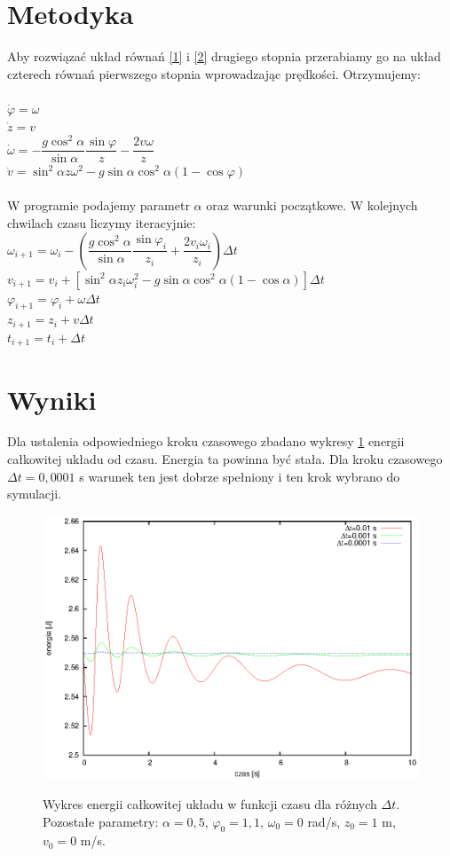 \documentclass[11pt]{article}
\begin{document}
\section*{Metodyka}
Aby rozwiązać układ równań \ref{1} i \ref{2} drugiego stopnia przerabiamy go na układ czterech równań
pierwszego stopnia wprowadzając prędkości. Otrzymujemy:\\
\\
$
\dot{\varphi}=\omega
$\\
$
\dot{z}=v
$\\
$
\dot{\omega}=-\dfrac{g\cos^2\alpha}{\sin\alpha}\dfrac{\sin\varphi}{z} - \dfrac{2v\omega}{z}
$\\
$
\dot{v}=\sin^2\alpha z \omega^2 -g\sin\alpha \cos^2\alpha(1-\cos\varphi)
$\\
$ $\\
W programie podajemy parametr $\alpha$ oraz warunki początkowe. W kolejnych chwilach czasu
liczymy iteracyjnie:\\
$ \omega_{i+1}=\omega_i-\left( \dfrac{g\cos^2\alpha}{\sin\alpha} \dfrac{\sin\varphi_i}{z_i}
+\dfrac{2v_i\omega_i}{z_i}\right)\Delta t$\\
$ v_{i+1} = v_i + \left[ \sin^2\alpha z_i \omega_i^2 -g\sin\alpha\cos^2\alpha (1-\cos\alpha )\right]\Delta t$\\
$ \varphi_{i+1} = \varphi_i +\omega \Delta t$\\
$ z_{i+1} = z_i + v\Delta t$\\
$ t_{i+1} = t_i + \Delta t $
\section*{Wyniki}
Dla ustalenia odpowiedniego kroku czasowego zbadano wykresy \ref{wyk1} energii całkowitej układu od czasu.
Energia ta powinna być stała. Dla kroku czasowego $\Delta t = 0,0001$ s warunek ten jest dobrze spełniony i ten
krok wybrano do symulacji.

\begin{figure}[h!]
\centering
\includegraphics[]{E.eps}
\caption{Wykres energii całkowitej układu w funkcji czasu dla różnych $\Delta t$.
	Pozostałe parametry: $\alpha = 0,5$, $\varphi_0=1,1$, $\omega_0=0 $ rad/s, $z_0=1$ m, $v_0=0 $ m/s.}{\label{wyk1}}
\end{figure}
\end{document}
